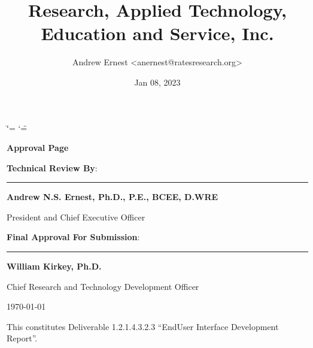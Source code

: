 \documentclass[letterpaper,12pt,english,openany,oneside]{sphinxmanual}
\title{Research, Applied Technology, Education and Service, Inc.}
\date{Jan 08, 2023}
\author{Andrew Ernest <anernest@ratesresearch.org>}
\begin{document}
\ifdefined\shorthandoff
  \ifnum\catcode`\=\string=\active\shorthandoff{=}\fi
  \ifnum\catcode`\"=\active{}\fi
\fi

\pagestyle{empty}
 
\sphinxmaketitle
    \newcommand\signature[3]{%
    {\sffamily
    \vspace{1cm}\par
    \textbf{#1}:\par
        \begin{minipage}{10cm}
        \centering
        \vspace{3cm}\par
        \rule{10cm}{1pt}\par
        \textbf{#2}\par
        #3%
        \end{minipage}
    }
    }
    \newcommand\insertdate[1][\today]{\vfill\begin{flushright}#1\end{flushright}}
    {\LARGE\sffamily \textbf{Approval Page}}
    
    \signature{Technical Review By}{Andrew N.S. Ernest, Ph.D., P.E., BCEE, D.WRE}{President and Chief Executive Officer}
    
    \signature{Final Approval For Submission}{William Kirkey, Ph.D.}{Chief Research and Technology Development Officer}
        
    \insertdate

\pagestyle{plain}
\sphinxtableofcontents
\pagestyle{normal}
\label{\detokenize{euidev/index::doc}}


\sphinxAtStartPar
This constitutes Deliverable 1.2.1.4.3.2.3 “End\sphinxhyphen{}User Interface Development Report”.

\sphinxstepscope
\end{document}
